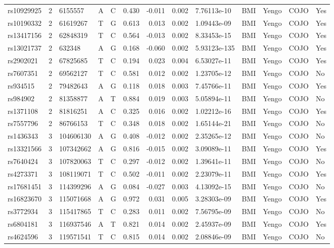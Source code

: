 \documentclass[11pt,twoside]{bristolthesis}
\begin{document}
\begin{longtable}[t]{lrlllrrrlllll}
\addlinespace
rs10929925 & 2 & 6155557 & A & C & 0.430 & -0.011 & 0.002 & 7.76113e-10 & BMI & Yengo & COJO & Yes\\
rs10190332 & 2 & 61619267 & T & G & 0.613 & 0.013 & 0.002 & 1.09443e-09 & BMI & Yengo & COJO & Yes\\
rs13417156 & 2 & 62848319 & T & C & 0.564 & -0.013 & 0.002 & 8.33453e-15 & BMI & Yengo & COJO & Yes\\
rs13021737 & 2 & 632348 & A & G & 0.168 & -0.060 & 0.002 & 5.93123e-135 & BMI & Yengo & COJO & Yes\\
rs2902021 & 2 & 67825685 & T & C & 0.194 & 0.023 & 0.004 & 6.53027e-11 & BMI & Yengo & COJO & Yes\\
\addlinespace
rs7607351 & 2 & 69562127 & T & C & 0.581 & 0.012 & 0.002 & 1.23705e-12 & BMI & Yengo & COJO & No\\
rs934515 & 2 & 79482643 & A & G & 0.118 & 0.018 & 0.003 & 7.45766e-11 & BMI & Yengo & COJO & Yes\\
rs984902 & 2 & 81358877 & A & T & 0.884 & 0.019 & 0.003 & 5.05894e-11 & BMI & Yengo & COJO & No\\
rs1371108 & 2 & 81816251 & A & C & 0.325 & 0.016 & 0.002 & 1.02212e-16 & BMI & Yengo & COJO & Yes\\
rs7557796 & 2 & 86766153 & T & C & 0.348 & 0.018 & 0.002 & 1.65144e-21 & BMI & Yengo & COJO & No\\
\addlinespace
rs1436343 & 3 & 104606130 & A & G & 0.408 & -0.012 & 0.002 & 2.35265e-12 & BMI & Yengo & COJO & No\\
rs13321566 & 3 & 107342662 & A & G & 0.816 & -0.015 & 0.002 & 3.09089e-11 & BMI & Yengo & COJO & Yes\\
rs7640424 & 3 & 107820063 & T & C & 0.297 & -0.012 & 0.002 & 1.39641e-11 & BMI & Yengo & COJO & No\\
rs4273371 & 3 & 108119071 & T & C & 0.502 & -0.011 & 0.002 & 2.23079e-11 & BMI & Yengo & COJO & Yes\\
rs17681451 & 3 & 114399296 & A & G & 0.084 & -0.027 & 0.003 & 4.13092e-15 & BMI & Yengo & COJO & No\\
\addlinespace
rs16823670 & 3 & 115071668 & A & G & 0.972 & 0.031 & 0.005 & 3.28303e-09 & BMI & Yengo & COJO & Yes\\
rs3772934 & 3 & 115417865 & T & C & 0.283 & 0.011 & 0.002 & 7.56795e-09 & BMI & Yengo & COJO & No\\
rs6804181 & 3 & 116937546 & A & T & 0.821 & 0.014 & 0.002 & 2.45937e-09 & BMI & Yengo & COJO & Yes\\
rs4624596 & 3 & 119571541 & T & C & 0.815 & 0.014 & 0.002 & 2.08846e-09 & BMI & Yengo & COJO & No\\

\end{longtable}
\end{document}

